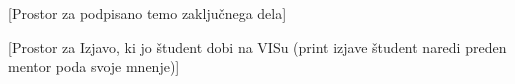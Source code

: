 %
\hypersetup{pageanchor=false} %

\newpage

\mbox{}\thispagestyle{empty}
\newpage


\newpage
\hypersetup{pageanchor=true} %

\thispagestyle{empty}
[Prostor za podpisano temo zaključnega dela]
\newpage

\pagestyle{fancy_nohead}

\newpage

\thispagestyle{empty}
[Prostor za Izjavo, ki jo študent dobi na VISu (print izjave študent naredi preden mentor poda svoje mnenje)]
\newpage


\newpage

 